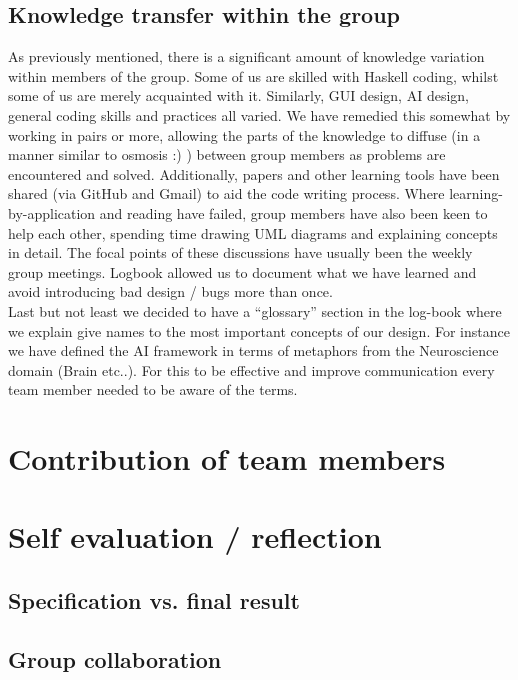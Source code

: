 \documentclass[11pt]{article}
\begin{document}
\subsection{Knowledge transfer within the group}
As previously mentioned, there is a significant amount of knowledge variation
within members of the group. Some of us are skilled with Haskell coding, whilst
some of us are merely acquainted with it. Similarly, GUI design, AI design,
general coding skills and practices all varied. We have remedied this 
somewhat by working in pairs or more, allowing the parts of the knowledge to 
diffuse (in a manner similar to osmosis :) ) between group
members as problems are encountered and solved. Additionally, papers and other
learning tools have been shared (via GitHub and Gmail) to aid the code writing
process. Where  learning-by-application and reading have failed, group members have also been
keen to help each other, spending time drawing UML diagrams and explaining concepts
in detail. The focal points of these discussions have usually been the weekly 
group meetings. Logbook allowed us to document what we have learned and avoid
introducing bad design / bugs more than once. 
\\ 
Last but not least we decided to have a ``glossary'' section in the log-book 
where we explain give names to the most important concepts of our design. For instance
we have defined the AI framework in terms of metaphors from the Neuroscience
domain (Brain etc..). For this to be effective and improve communication every 
team member needed to be aware of the terms.

\section{Contribution of team members}

\section{Self evaluation / reflection}

\subsection{Specification vs. final result}

\subsection{Group collaboration}
\end{document}
